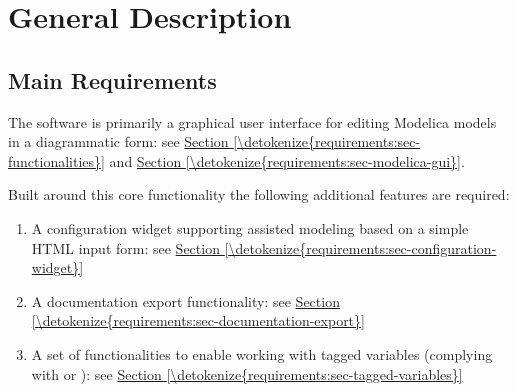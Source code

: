 \documentclass[letterpaper,10pt, openany,english]{sphinxmanual}
\begin{document}
\section{General Description}
\label{\detokenize{requirements:general-description}}\label{\detokenize{requirements:sec-general-description}}

\subsection{Main Requirements}
\label{\detokenize{requirements:main-requirements}}
The software is primarily a graphical user interface for editing Modelica models in a diagrammatic form: see \hyperref[\detokenize{requirements:sec-functionalities}]{Section \ref{\detokenize{requirements:sec-functionalities}}} and \hyperref[\detokenize{requirements:sec-modelica-gui}]{Section \ref{\detokenize{requirements:sec-modelica-gui}}}.

Built around this core functionality the following additional features are required:
\begin{enumerate}
%
\item {} 
A configuration widget supporting assisted modeling based on a simple HTML input form: see \hyperref[\detokenize{requirements:sec-configuration-widget}]{Section \ref{\detokenize{requirements:sec-configuration-widget}}}

\item {} 
A documentation export functionality: see \hyperref[\detokenize{requirements:sec-documentation-export}]{Section \ref{\detokenize{requirements:sec-documentation-export}}}

\item {} 
A set of functionalities to enable working with tagged variables (complying with  or ): see \hyperref[\detokenize{requirements:sec-tagged-variables}]{Section \ref{\detokenize{requirements:sec-tagged-variables}}}

\end{enumerate}
\end{document}
